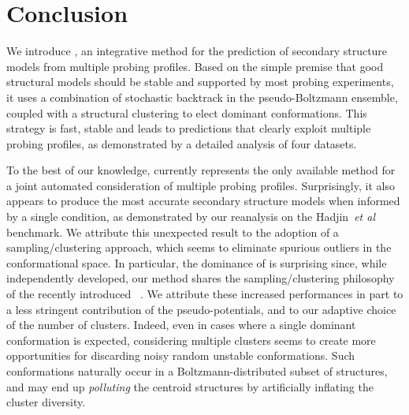 \documentclass[a4,center,fleqn]{NAR}
\newcommand{\Software}[1]{\text{\ttfamily\bfseries #1}}
\newcommand{\OurTool}{\Software{IPANEMAP}\xspace}
\newcommand{\etal}{~\emph{et al} }
\begin{document}





\section{Conclusion}

We introduce \OurTool{}, an integrative method for the prediction of secondary structure models from multiple probing profiles. Based on the simple premise that good structural models should be stable and supported by most probing experiments, it uses a combination of stochastic backtrack in the pseudo-Boltzmann ensemble, coupled with a structural clustering to elect dominant conformations. This strategy is fast, stable and leads to predictions that clearly exploit multiple probing profiles, as demonstrated by a detailed analysis of four datasets. 


To the best of our knowledge, \OurTool currently represents the only available method for a joint automated consideration of multiple probing profiles. Surprisingly, it also appears to produce the most accurate secondary structure models when informed by a single condition, as demonstrated by our reanalysis on the Hadjin\etal\cite{Hajdin2013} benchmark. We attribute this unexpected result to the adoption of a sampling/clustering approach, which seems to eliminate spurious outliers in the conformational space. In particular, the dominance of \OurTool is surprising since, while independently developed, our method shares the sampling/clustering philosophy of the recently introduced \Software{Rsample}~\cite{Mathews2017}. We attribute these increased performances in part to a less stringent contribution of the pseudo-potentials, and to our adaptive choice of the number of clusters. Indeed, even in cases where a single dominant conformation is expected, considering multiple clusters seems to create more opportunities for discarding noisy random unstable conformations. Such conformations naturally occur in a Boltzmann-distributed subset of structures, and may end up \emph{polluting} the centroid structures by artificially inflating the cluster diversity. 
\end{document}

